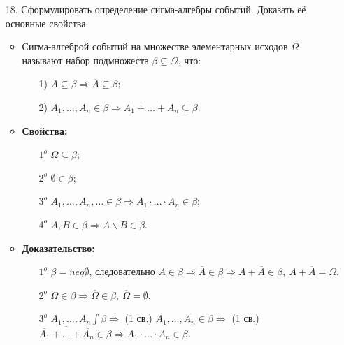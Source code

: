 \documentclass[a4paper]{article}
\begin{document}
\begin{enumerate}
\item[18.] Сформулировать определение сигма-алгебры событий. Доказать её основные свойства. \\
\begin{itemize}
\item Сигма-алгеброй событий на множестве элементарных исходов $\Omega$ называют набор подмножеств $\beta \subseteq \Omega$, что:
	\begin{enumerate}
	\item[1)] $A \subseteq \beta \Rightarrow \overline{A} \subseteq \beta$;
	\item[2)] $A_1, \ldots, A_n \in \beta \Rightarrow A_1 + \ldots + A_n \subseteq \beta$.
	\end{enumerate}
\item \textbf{Свойства:}
	\begin{enumerate}
	\item[$1^o$] $\Omega \subseteq \beta$; 
	\item[$2^o$] $\emptyset \in \beta$;
	\item[$3^o$] $A_1, \ldots, A_n, \ldots \in \beta \Rightarrow A_1 \cdot \ldots \cdot A_n \in \beta$;
	\item[$4^o$] $A, B \in \beta \Rightarrow A \backslash B \in \beta$.
	\end{enumerate}
\item \textbf{Доказательство:}
	\begin{enumerate}
	\item[$1^o$] $\beta =neq \emptyset$, следовательно $A \in \beta \Rightarrow \overline{A} \in \beta \Rightarrow A + \overline{A} \in \beta, \ A + \overline{A} = \Omega$.
	\item[$2^o$] $\Omega \in \beta \Rightarrow \overline{\Omega} \in \beta, \ \overline{\Omega} = \emptyset$.
	\item[$3^o$] $A_1, \ldots, A_n \int \beta \Rightarrow$ (1 св.) $\overline{A_1}, \ldots, \overline{A_n} \in \beta \Rightarrow$ (1 св.) $\overline{\overline{A_1} + \ldots + \overline{A_n}} \in \beta \Rightarrow A_1 \cdot \ldots \cdot A_n \in \beta$.
	\end{enumerate}
\end{itemize}




\end{enumerate}
\end{document}
